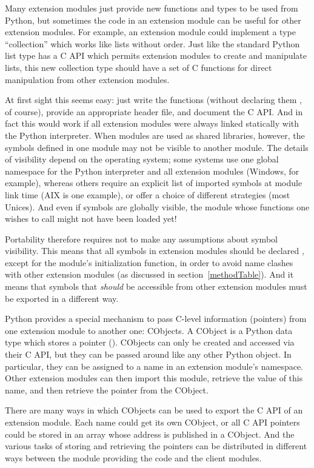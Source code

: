 Many extension modules just provide new functions and types to be
used from Python, but sometimes the code in an extension module can
be useful for other extension modules. For example, an extension
module could implement a type ``collection'' which works like lists
without order. Just like the standard Python list type has a C API
which permits extension modules to create and manipulate lists, this
new collection type should have a set of C functions for direct
manipulation from other extension modules.

At first sight this seems easy: just write the functions (without
declaring them , of course), provide an appropriate
header file, and document the C API. And in fact this would work if
all extension modules were always linked statically with the Python
interpreter. When modules are used as shared libraries, however, the
symbols defined in one module may not be visible to another module.
The details of visibility depend on the operating system; some systems
use one global namespace for the Python interpreter and all extension
modules (Windows, for example), whereas others require an explicit
list of imported symbols at module link time (AIX is one example), or
offer a choice of different strategies (most Unices). And even if
symbols are globally visible, the module whose functions one wishes to
call might not have been loaded yet!

Portability therefore requires not to make any assumptions about
symbol visibility. This means that all symbols in extension modules
should be declared , except for the module's
initialization function, in order to avoid name clashes with other
extension modules (as discussed in section~\ref{methodTable}). And it
means that symbols that \emph{should} be accessible from other
extension modules must be exported in a different way.

Python provides a special mechanism to pass C-level information
(pointers) from one extension module to another one: CObjects.
A CObject is a Python data type which stores a pointer ().  CObjects can only be created and accessed via their C API, but
they can be passed around like any other Python object. In particular, 
they can be assigned to a name in an extension module's namespace.
Other extension modules can then import this module, retrieve the
value of this name, and then retrieve the pointer from the CObject.

There are many ways in which CObjects can be used to export the C API
of an extension module. Each name could get its own CObject, or all C
API pointers could be stored in an array whose address is published in
a CObject. And the various tasks of storing and retrieving the pointers
can be distributed in different ways between the module providing the
code and the client modules.

